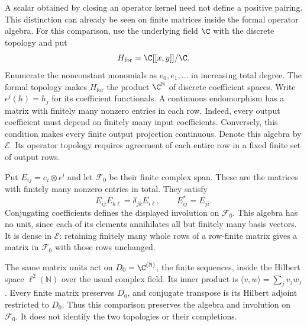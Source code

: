 A scalar obtained by closing an operator kernel need not define a
positive pairing.  This distinction can already be seen on finite
matrices inside the formal operator algebra.
For this comparison, use the underlying field $\C$ with the discrete
topology and put
\[
 H_{\mathrm{for}}=\C[[x,y]]/\C.
\]
Enumerate the nonconstant monomials as $e_0,e_1,\ldots$ in increasing
total degree.  The formal topology makes $H_{\mathrm{for}}$ the product
$\C^{\mathbb N}$ of discrete coefficient spaces.  Write
$\epsilon^j(h)=h_j$ for its coefficient functionals.
A continuous endomorphism has a matrix with finitely many nonzero entries
in each row.  Indeed, every output coefficient must depend on finitely
many input coefficients.  Conversely, this condition makes every finite
output projection continuous.  Denote this algebra by $\mathscr E$.
Its operator topology requires agreement of each entire row in a fixed
finite set of output rows.

Put $E_{ij}=e_i\otimes\epsilon^j$ and let $\mathscr F_0$ be their
finite complex span.  These are the matrices with finitely many nonzero
entries in total.  They satisfy
\[
 E_{ij}E_{k\ell}=\delta_{jk}E_{i\ell},\qquad
 E_{ij}^*=E_{ji}.
\]
Conjugating coefficients defines the displayed involution on
$\mathscr F_0$.  This algebra has no unit, since each of its elements
annihilates all but finitely many basis vectors.
It is dense in $\mathscr E$: retaining finitely many whole rows of a
row-finite matrix gives a matrix in $\mathscr F_0$ with those rows unchanged.

The same matrix units act on $D_0=\C^{(\mathbb N)}$, the finite sequences,
inside the Hilbert space $\ell^2(\mathbb N)$ over the usual complex field.
Its inner product is $\langle v,w\rangle=\sum_jv_j\overline{w_j}$.
Every finite matrix preserves $D_0$, and conjugate transpose is its
Hilbert adjoint restricted to $D_0$.  Thus this comparison preserves the
algebra and involution on $\mathscr F_0$.  It does not identify the two
topologies or their completions.

